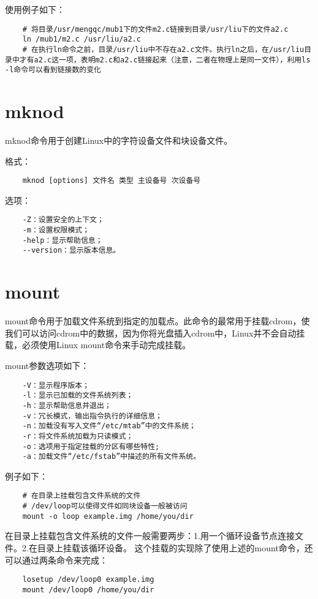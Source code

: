 \documentclass[a4paper,left=2.5cm,right=2.5cm,11pt]{article}
\begin{document}
	使用例子如下：
	\begin{lstlisting}
	# 将目录/usr/mengqc/mub1下的文件m2.c链接到目录/usr/liu下的文件a2.c
	ln /mub1/m2.c /usr/liu/a2.c
	# 在执行ln命令之前，目录/usr/liu中不存在a2.c文件。执行ln之后，在/usr/liu目录中才有a2.c这一项，表明m2.c和a2.c链接起来（注意，二者在物理上是同一文件），利用ls -l命令可以看到链接数的变化
	\end{lstlisting}

\section{mknod}
	mknod命令用于创建Linux中的字符设备文件和块设备文件。\par

	格式：
	\begin{lstlisting}
	mknod [options] 文件名 类型 主设备号 次设备号
	\end{lstlisting}

	选项：
	\begin{lstlisting}
	-Z：设置安全的上下文； 
	-m：设置权限模式； 
	-help：显示帮助信息； 
	--version：显示版本信息。
	\end{lstlisting}

\section{mount}
	mount命令用于加载文件系统到指定的加载点。此命令的最常用于挂载cdrom，使我们可以访问cdrom中的数据，因为你将光盘插入cdrom中，Linux并不会自动挂载，必须使用Linux mount命令来手动完成挂载。\par

	mount参数选项如下：
	\begin{lstlisting}
	-V：显示程序版本； 
	-l：显示已加载的文件系统列表； 
	-h：显示帮助信息并退出； 
	-v：冗长模式，输出指令执行的详细信息； 
	-n：加载没有写入文件“/etc/mtab”中的文件系统； 
	-r：将文件系统加载为只读模式； 
	-o：选项用于指定挂载的分区有哪些特性;
	-a：加载文件“/etc/fstab”中描述的所有文件系统。
	\end{lstlisting}

	例子如下：
	\begin{lstlisting}
	# 在目录上挂载包含文件系统的文件
	# /dev/loop可以使得文件如同块设备一般被访问
	mount -o loop example.img /home/you/dir
	\end{lstlisting}

	在目录上挂载包含文件系统的文件一般需要两步：1.用一个循环设备节点连接文件。2.在目录上挂载该循环设备。
	这个挂载的实现除了使用上述的mount命令，还可以通过两条命令来完成：
	\begin{lstlisting}
	losetup /dev/loop0 example.img
	mount /dev/loop0 /home/you/dir
	\end{lstlisting}
\end{document}
